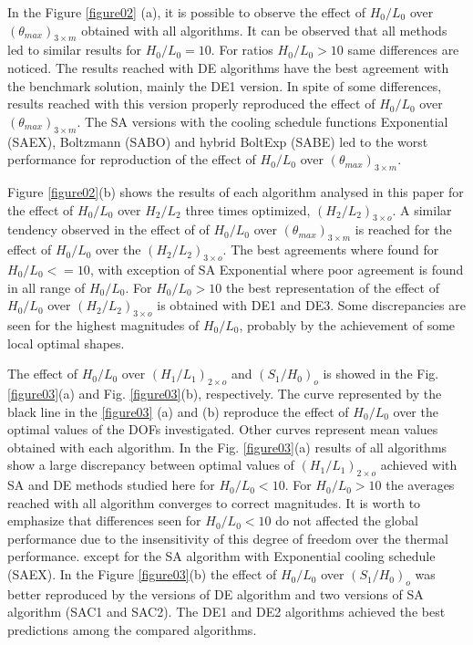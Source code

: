 \documentclass[12pt,fleqn]{article}
\begin{document}
In the Figure \ref{figure02} (a), it is possible to observe the effect of $H_{0}/L_{0}$ over $({\theta}_{max})_{3\times m}$ obtained with all algorithms. It can be observed that all methods led to similar results for $H_{0}/L_{0}=10$. For ratios $H_{0}/L_{0}>10$ same differences are noticed. The results reached with DE algorithms have the best agreement with the benchmark solution, mainly the DE1 version. In spite of some differences, results reached with this version properly reproduced the effect of $H_{0}/L_{0}$ over $({\theta}_{max})_{3\times m}$. The SA versions with the cooling schedule functions Exponential (SAEX), Boltzmann (SABO) and hybrid BoltExp (SABE) led to the worst performance for reproduction of the effect of  $H_{0}/L_{0}$ over $({\theta}_{max})_{3\times m}$.

Figure \ref{figure02}(b) shows the results of each algorithm analysed in this paper for the effect of  $H_{0}/L_{0}$ over $H_{2}/L_{2}$ three times optimized, $(H_{2}/L_{2})_{3\times o}$. A similar tendency observed in the effect of of $H_{0}/L_{0}$ over $({\theta}_{max})_{3\times m}$ is reached for the effect of $H_{0}/L_{0}$ over the $(H_{2}/L_{2})_{3\times o}$. The best agreements where found for $H_{0}/L_{0}<=10$, with exception of SA Exponential where poor agreement is found in all range of $H_{0}/L_{0}$. For $H_{0}/L_{0}>10$ the best representation of the effect of $H_{0}/L_{0}$ over $(H_{2}/L_{2})_{3\times o}$ is obtained with DE1 and DE3. Some discrepancies are seen for the highest magnitudes of $H_{0}/L_{0}$, probably by the achievement of some local optimal shapes.

The effect of $H_{0}/L_{0}$ over $(H_{1}/L_{1})_{2\times o}$ and $(S_{1}/H_{0})_{o}$ is showed in the Fig. \ref{figure03}(a) and Fig. \ref{figure03}(b), respectively. The curve represented by the black line in the \ref{figure03} (a) and (b) reproduce the effect of $H_{0}/L_{0}$ over the optimal values of the DOFs investigated. Other curves represent mean values obtained with each algorithm. In the Fig. \ref{figure03}(a) results of all algorithms show a large discrepancy between optimal values of $(H_{1}/L_{1})_{2\times o}$ achieved with SA and DE methods studied here for $H_{0}/L_{0}<10$. For $H_{0}/L_{0}>10$ the averages reached with all algorithm converges to correct magnitudes. It is worth to emphasize that differences seen for $H_{0}/L_{0}<10$ do not affected the global performance due to the insensitivity of this degree of freedom over the thermal performance. except for the SA algorithm with Exponential cooling schedule (SAEX). In the Figure \ref{figure03}(b) the effect of $H_{0}/L_{0}$ over $(S_{1}/H_{0})_{o}$ was better reproduced by the versions of DE algorithm and two versions of SA algorithm (SAC1 and SAC2). The DE1 and DE2 algorithms achieved the best predictions among the compared algorithms.
\end{document}
